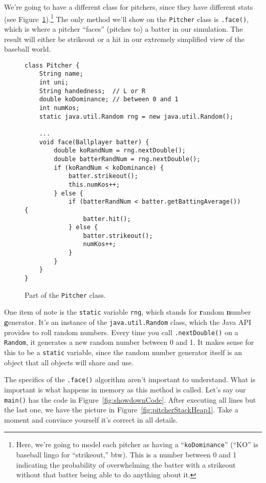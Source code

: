 We're going to have a different class for pitchers, since they have different
stats (see Figure~\ref{fig:PitcherCode}).\footnote{Here, we're going to model
each pitcher as having a ``\texttt{koDominance}'' (``KO'' is baseball lingo for
``strikeout,'' btw). This is a number between 0 and 1 indicating the
probability of overwhelming the batter with a strikeout without that batter
being able to do anything about it.} The only method we'll show on the
\texttt{Pitcher} class is \texttt{.face()}, which is where a pitcher ``faces''
(pitches to) a batter in our simulation. The result will either be strikeout
or a hit in our extremely simplified view of the baseball world.

\begin{figure}[ht]
\begin{Verbatim}[fontsize=\footnotesize,samepage=true,frame=single]
class Pitcher {
    String name;
    int uni;
    String handedness;  // L or R
    double koDominance; // between 0 and 1
    int numKos;
    static java.util.Random rng = new java.util.Random();

    ...
    void face(Ballplayer batter) {
        double koRandNum = rng.nextDouble();
        double batterRandNum = rng.nextDouble();
        if (koRandNum < koDominance) {
            batter.strikeout();
            this.numKos++;
        } else {
            if (batterRandNum < batter.getBattingAverage()) {
                batter.hit();
            } else {
                batter.strikeout();
                numKos++;
            }
        }
    }
}
\end{Verbatim}
\caption{Part of the \texttt{Pitcher} class.}
\label{fig:PitcherCode}
\end{figure}

One item of note is the \texttt{static} variable \texttt{rng}, which stands
for \textbf{r}andom \textbf{n}umber \textbf{g}enerator. It's an instance of
the \texttt{java.util.Random} class, which the Java API provides to roll
random numbers. Every time you call \texttt{.nextDouble()} on a
\texttt{Random}, it generates a new random number between 0 and 1. It makes
sense for this to be a \texttt{static} variable, since the random number
generator itself is an object that all objects will share and use.

The specifics of the \texttt{.face()} algorithm aren't important to
understand. What is important is what happens in memory as this method is
called. Let's say our \texttt{main()} has the code in
Figure~\ref{fig:showdownCode}. After executing all lines but the last one, we
have the picture in Figure~\ref{fig:pitcherStackHeap1}. Take a moment and
convince yourself it's correct in all details.

